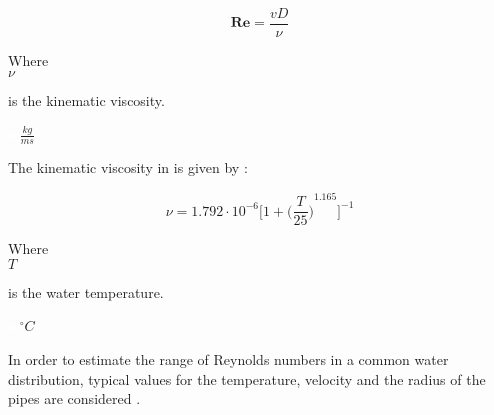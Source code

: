 \begin{equation}
   \pmb{Re} = \frac{vD}{\nu}
   \label{Reynolds}
 \end{equation}
 
  \begin{minipage}[t]{0.20\textwidth}
Where\\
\hspace*{8mm} $\nu$ 
\end{minipage}
\begin{minipage}[t]{0.68\textwidth}
\vspace*{2mm}
is the kinematic viscosity.

\end{minipage}
\begin{minipage}[t]{0.10\textwidth}
\vspace*{2mm}
\textcolor{White}{te}$\unit{\frac{kg}{ms}}$
\end{minipage}

The kinematic viscosity in \cite{Design_Water} is given by :

\begin{equation}
  \nu = 1.792 \cdot 10^{-6} \bigg[1+{\bigg(\frac{T}{25}\bigg)}^{1.165} \bigg]^{-1}
\end{equation}

  \begin{minipage}[t]{0.20\textwidth}
Where\\
\hspace*{8mm} $T$ 
\end{minipage}
\begin{minipage}[t]{0.68\textwidth}
\vspace*{2mm}
is the water temperature.
 \end{minipage}
\begin{minipage}[t]{0.10\textwidth}
\vspace*{2mm}
\textcolor{White}{te}$\unit{^{\circ} C}$
\end{minipage}

In order to estimate the range of Reynolds numbers in a common water 
distribution, typical values for the temperature, velocity and the radius of 
the pipes are considered \cite{Urban_Design}. 



